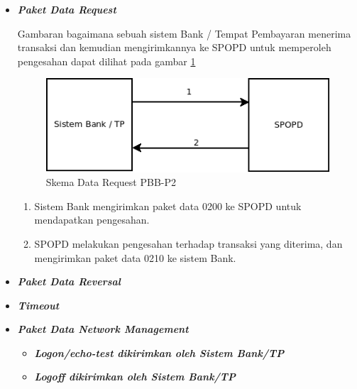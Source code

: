 \begin{itemize}

  \item \textbf{\textit{Paket Data Request}}
  
  Gambaran bagaimana sebuah sistem Bank / Tempat Pembayaran menerima transaksi dan kemudian mengirimkannya ke SPOPD untuk memperoleh pengesahan dapat dilihat pada gambar \ref{fig:data-request}
  
  \begin{figure}[H]
    \centering
    \includegraphics[width=1\textwidth]{./resources/dia-data-request}
    \caption{Skema Data Request PBB-P2}
    \label{fig:data-request}
  \end{figure}
  
  \begin{enumerate}[1.]
    \item Sistem Bank mengirimkan paket data 0200 ke SPOPD untuk mendapatkan pengesahan.
    \item SPOPD melakukan pengesahan terhadap transaksi yang diterima, dan mengirimkan paket data 0210 ke sistem Bank.
  \end{enumerate}
  
  \item \textbf{\textit{Paket Data Reversal}}
  
  
  
  \item \textbf{\textit{Timeout}}
  
  \item \textbf{\textit{Paket Data Network Management}}
  
  \begin{itemize}
    \item \textbf{\textit{Logon/echo-test dikirimkan oleh Sistem Bank/TP}}
    \item \textbf{\textit{Logoff dikirimkan oleh Sistem Bank/TP}}
  \end{itemize}

\end{itemize}